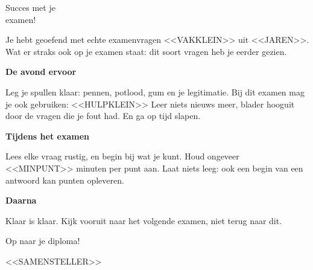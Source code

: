\documentclass[11pt,twoside]{book}
\begin{document}
\clearpage
\ifodd\value{page}\else\thispagestyle{leeg}\mbox{}\clearpage\fi
\thispagestyle{leeg}\noindent
{}
\par
\vspace*{30mm}
{\sffamily\zwart\fontsize{26}{30}\selectfont Succes met je\\examen!\par}\vskip 6mm
{\opmaakproza\fontsize{11}{16.5}\selectfont
Je hebt geoefend met echte examenvragen <<VAKKLEIN>> uit <<JAREN>>. Wat er straks ook op je examen staat:
dit soort vragen heb je eerder gezien.\par}
\vskip 7mm
{\opmaakproza\small\setlength\parskip{1.6mm}
{\sffamily\bfseries\color{kleur1}De avond ervoor}\par
Leg je spullen klaar: pennen, potlood, gum en je legitimatie. Bij dit examen mag je ook gebruiken: <<HULPKLEIN>>
Leer niets nieuws meer, blader hooguit door de vragen die je fout had. En ga op tijd slapen.\par
\vskip 2mm
{\sffamily\bfseries\color{kleur1}Tijdens het examen}\par
Lees elke vraag rustig, en begin bij wat je kunt. Houd ongeveer <<MINPUNT>> minuten per punt aan.
Laat niets leeg: ook een begin van een antwoord kan punten opleveren.\par
\vskip 2mm
{\sffamily\bfseries\color{kleur1}Daarna}\par
Klaar is klaar. Kijk vooruit naar het volgende examen, niet terug naar dit.\par}
\vfill
{\sffamily\zwart\large\color{kleur2}Op naar je diploma!\par}
\vskip 2mm
{\sffamily\small\color{grijs}<<SAMENSTELLER>>\par}
\end{document}
